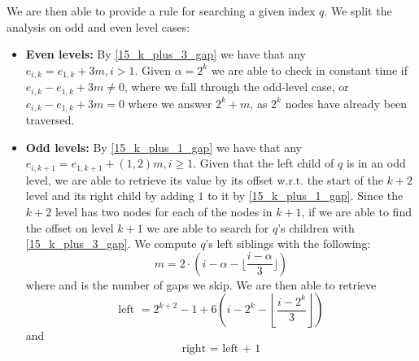 We are then able to provide a rule for searching a given index $q$.
We split the analysis on odd and even level cases:
\begin{itemize}
    \item  \textbf{Even levels:} By \ref{15_k_plus_3_gap} we have that any $e_{i, k} = e_{1, k} + 3m, i > 1$.
    Given $\alpha = 2^k$ we are able to check in constant time if $e_{i, k} - e_{1, k} + 3m \neq 0$, where we fall through the odd-level case, or $e_{i, k} - e_{1, k} + 3m = 0$ where we answer $2^k + m$, as $2^k$ nodes have already been traversed.
    \item \textbf{Odd levels:} By \ref{15_k_plus_1_gap} we have that any $e_{i, k + 1} = e_{1, k + 1} + (1, 2)m, i \geq 1$.
    Given that the left child of $q$ is in an odd level, we are able to retrieve its value by its offset w.r.t. the start of the $k + 2$ level and its right child by adding $1$ to it by \ref{15_k_plus_1_gap}.
    Since the $k + 2$ level has two nodes for each of the nodes in $k + 1$, if we are able to find the offset on level $k + 1$ we are able to search for $q$'s children with \ref{15_k_plus_3_gap}.
    We compute $q$'s left siblings with the following:
    \begin{equation*}
    m = 2 \cdot (i-\alpha -\lfloor \frac{i-\alpha}{3} \rfloor)
    \end{equation*}
    where and is the number of gaps we skip.
    We are then able to retrieve
    \begin{equation*}
    \textrm{left } = 2^{k+2}-1+6\left(i-2^k- \left\lfloor \frac{i-2^k}{3} \right\rfloor\right)
    \end{equation*}
    and
    \begin{equation*}
    \textrm{right = left + 1}
    \end{equation*}
\end{itemize}
